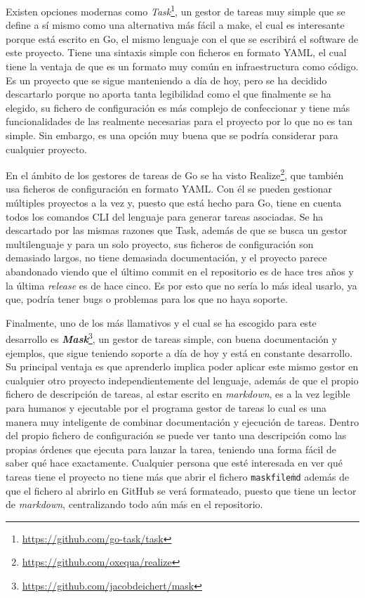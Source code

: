 Existen opciones modernas como
\textit{Task}\footnote{\url{https://github.com/go-task/task}}, un gestor de
tareas muy simple que se define a sí mismo como una alternativa más fácil a
make, el cual es interesante porque está escrito en Go, el mismo lenguaje con el
que se escribirá el software de este proyecto. Tiene una sintaxis simple con
ficheros en formato YAML, el cual tiene la ventaja de que es un formato muy
común en infraestructura como código. Es un proyecto que se sigue manteniendo a
día de hoy, pero se ha decidido descartarlo porque no aporta tanta legibilidad
como el que finalmente se ha elegido, su fichero de configuración es más
complejo de confeccionar y tiene más funcionalidades de las realmente necesarias
para el proyecto por lo que no es tan simple. Sin embargo, es una opción muy
buena que se podría considerar para cualquier proyecto.

En el ámbito de los gestores de tareas de Go se ha visto
Realize\footnote{\url{https://github.com/oxequa/realize}}, que también usa
ficheros de configuración en formato YAML. Con él se pueden gestionar múltiples
proyectos a la vez y, puesto que está hecho para Go, tiene en cuenta todos los
comandos CLI del lenguaje para generar tareas asociadas. Se ha descartado por
las mismas razones que Task, además de que se busca un gestor multilenguaje y
para un solo proyecto, sus ficheros de configuración son demasiado largos, no
tiene demasiada documentación, y el proyecto parece abandonado viendo que el
último commit en el repositorio es de hace tres años y la última
\textit{release} es de hace cinco. Es por esto que no sería lo más ideal usarlo,
ya que, podría tener bugs o problemas para los que no haya soporte.

Finalmente, uno de los más llamativos y el cual se ha escogido para este
desarrollo es
\textbf{\textit{Mask}}\footnote{\url{https://github.com/jacobdeichert/mask}}, un
gestor de tareas simple, con buena documentación y ejemplos, que sigue teniendo
soporte a día de hoy y está en constante desarrollo. Su principal ventaja es que
aprenderlo implica poder aplicar este mismo gestor en cualquier otro proyecto
independientemente del lenguaje, además de que el propio fichero de descripción
de tareas, al estar escrito en \textit{markdown}, es a la vez legible para
humanos y ejecutable por el programa gestor de tareas lo cual es una manera muy
inteligente de combinar documentación y ejecución de tareas. Dentro del propio
fichero de configuración se puede ver tanto una descripción como las propias
órdenes que ejecuta para lanzar la tarea, teniendo una forma fácil de saber qué
hace exactamente. Cualquier persona que esté interesada en ver qué tareas tiene
el proyecto no tiene más que abrir el fichero \texttt{maskfile\.md} además de
que el fichero al abrirlo en GitHub se verá formateado, puesto que tiene un
lector de \textit{markdown}, centralizando todo aún más en el repositorio.

